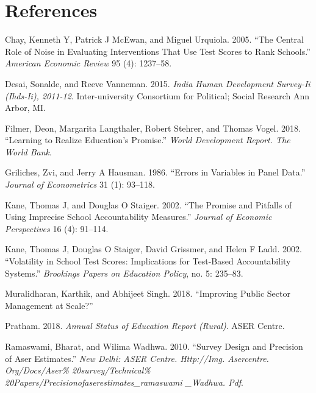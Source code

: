 \documentclass[
  11pt,
]{article}
\begin{document}
\newpage

\hypertarget{references}{%
\section{References}\label{references}}

\hypertarget{refs}{}
\leavevmode\hypertarget{ref-chay2005central}{}%
Chay, Kenneth Y, Patrick J McEwan, and Miguel Urquiola. 2005. ``The Central Role of Noise in Evaluating Interventions That Use Test Scores to Rank Schools.'' \emph{American Economic Review} 95 (4): 1237--58.

\leavevmode\hypertarget{ref-desai2015india}{}%
Desai, Sonalde, and Reeve Vanneman. 2015. \emph{India Human Development Survey-Ii (Ihds-Ii), 2011-12}. Inter-university Consortium for Political; Social Research Ann Arbor, MI.

\leavevmode\hypertarget{ref-filmer2018learning}{}%
Filmer, Deon, Margarita Langthaler, Robert Stehrer, and Thomas Vogel. 2018. ``Learning to Realize Education's Promise.'' \emph{World Development Report. The World Bank}.

\leavevmode\hypertarget{ref-griliches1986errors}{}%
Griliches, Zvi, and Jerry A Hausman. 1986. ``Errors in Variables in Panel Data.'' \emph{Journal of Econometrics} 31 (1): 93--118.

\leavevmode\hypertarget{ref-kane2002promise}{}%
Kane, Thomas J, and Douglas O Staiger. 2002. ``The Promise and Pitfalls of Using Imprecise School Accountability Measures.'' \emph{Journal of Economic Perspectives} 16 (4): 91--114.

\leavevmode\hypertarget{ref-kane2002volatility}{}%
Kane, Thomas J, Douglas O Staiger, David Grissmer, and Helen F Ladd. 2002. ``Volatility in School Test Scores: Implications for Test-Based Accountability Systems.'' \emph{Brookings Papers on Education Policy}, no. 5: 235--83.

\leavevmode\hypertarget{ref-muralidharan2018improving}{}%
Muralidharan, Karthik, and Abhijeet Singh. 2018. ``Improving Public Sector Management at Scale?''

\leavevmode\hypertarget{ref-aser2018}{}%
Pratham. 2018. \emph{Annual Status of Education Report (Rural)}. ASER Centre.

\leavevmode\hypertarget{ref-ramaswami2010survey}{}%
Ramaswami, Bharat, and Wilima Wadhwa. 2010. ``Survey Design and Precision of Aser Estimates.'' \emph{New Delhi: ASER Centre. Http://Img. Asercentre. Org/Docs/Aser\% 20survey/Technical\% 20Papers/Precisionofaserestimates\_ramaswami \_Wadhwa. Pdf}.
\end{document}
